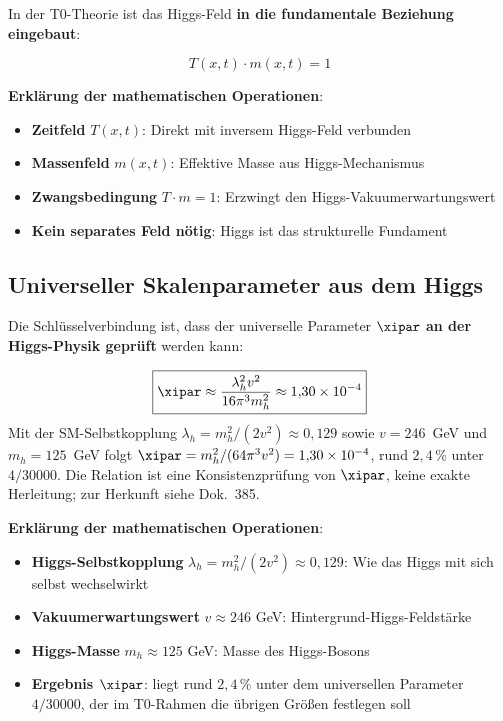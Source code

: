 	In der T0-Theorie ist das Higgs-Feld \textbf{in die fundamentale Beziehung eingebaut}:
	
	\begin{equation}
		\boxed{T(x,t) \cdot m(x,t) = 1}
		\label{eq:higgs_foundation}
	\end{equation}
	
	\textbf{Erklärung der mathematischen Operationen}:
	\begin{itemize}
		\item \textbf{Zeitfeld} $T(x,t)$: Direkt mit inversem Higgs-Feld verbunden
		\item \textbf{Massenfeld} $m(x,t)$: Effektive Masse aus Higgs-Mechanismus
		\item \textbf{Zwangsbedingung} $T \cdot m = 1$: Erzwingt den Higgs-Vakuumerwartungswert
		\item \textbf{Kein separates Feld nötig}: Higgs ist das strukturelle Fundament
	\end{itemize}
	
	\subsection{Universeller Skalenparameter aus dem Higgs}
	
	Die Schlüsselverbindung ist, dass der universelle Parameter $\xipar$ \textbf{an der Higgs-Physik geprüft} werden kann:
	
	\begin{equation}
		\boxed{\xipar \approx \frac{\lambda_h^2 v^2}{16\pi^3 m_h^2} \approx 1{,}30 \times 10^{-4}}
		\label{eq:xi_from_higgs}
	\end{equation}
	Mit der SM-Selbstkopplung $\lambda_h = m_h^2/(2v^2) \approx 0{,}129$ sowie $v = 246$~GeV und $m_h = 125$~GeV folgt $\xipar = m_h^2/(64\pi^3 v^2) = 1{,}30 \times 10^{-4}$, rund $2{,}4\,\%$ unter $4/30000$. Die Relation ist eine Konsistenzprüfung von $\xipar$, keine exakte Herleitung; zur Herkunft siehe Dok.~385.
	
	\textbf{Erklärung der mathematischen Operationen}:
	\begin{itemize}
		\item \textbf{Higgs-Selbstkopplung} $\lambda_h = m_h^2/(2v^2) \approx 0{,}129$: Wie das Higgs mit sich selbst wechselwirkt
		\item \textbf{Vakuumerwartungswert} $v \approx 246$ GeV: Hintergrund-Higgs-Feldstärke
		\item \textbf{Higgs-Masse} $m_h \approx 125$ GeV: Masse des Higgs-Bosons
		\item \textbf{Ergebnis $\xipar$}: liegt rund $2{,}4\,\%$ unter dem universellen Parameter $4/30000$, der im T0-Rahmen die übrigen Größen festlegen soll
	\end{itemize}
	
